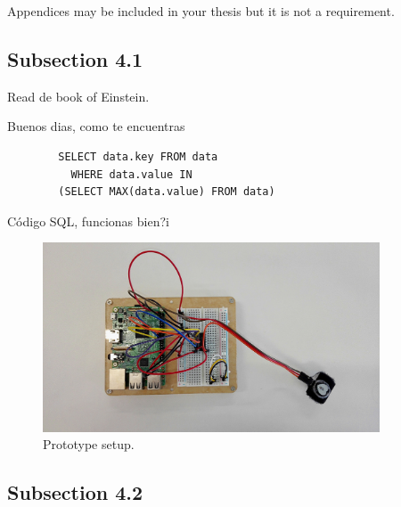 \documentclass[a4paper,12pt]{article}
\begin{document}
\clearpage
\newpage
\begin{appendices}

    {Appendices may be included in your thesis but it is not a requirement.}

\end{appendices}

\subsection{Subsection 4.1}
\label{subsec:subsec4.1}
\lipsum[8]
Read de book \cite{einstein} of Einstein.

Buenos dias, como te encuentras
\begin{listing}[H]
	\begin{verbatim}
		SELECT data.key FROM data
		  WHERE data.value IN
		(SELECT MAX(data.value) FROM data)
	\end{verbatim}
	\caption{Código SQL, funcionas bien?i}
	\label{listings:como va esto}
\end{listing}




\begin{figure}[H]
\label{fig:prototype1}
\centering
\includegraphics[width=10cm]{img/Chapter4/prototype1_edited.jpg}
\caption[Prototype setup]{\footnotesize{Prototype setup.}}
\end{figure}

\lipsum[14]

\subsection{Subsection 4.2}
\label{subsec:subsec4.2}
\end{document}
